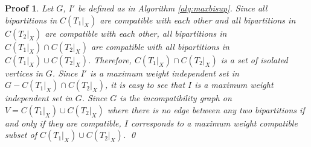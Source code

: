 \documentclass{bmcart}
\theoremstyle{mystyle}
\theoremstyle{proofstyle}
\newtheorem*{proof2}{Proof}
\newenvironment{proofnospace}{\begin{proof2}}{\qed \end{proof2}}
\begin{document}
\claimMaxCompatibleSubset*
\begin{proofnospace}
    Let $G$, $I'$ be defined as in Algorithm \ref{alg:maxbisup}. Since all bipartitions in $C(T_1|_X)$ are compatible with each other and all bipartitions in $C(T_2|_X)$ are compatible with each other, all bipartitions in $C(T_1|_X) \cap C(T_2|_X)$ are compatible with all bipartitions in $C(T_1|_X) \cup C(T_2|_X)$. Therefore, $C(T_1|_X) \cap C(T_2|_X)$ is a set of isolated vertices in $G$. Since $I'$ is a maximum weight independent set in $G - C(T_1|_X) \cap C(T_2|_X)$, it is easy to see that $I$ is a maximum weight independent set in $G$. Since $G$ is the incompatibility graph on $V = C(T_1|_X) \cup C(T_2|_X)$ where there is no edge between any two bipartitions if and only if they are compatible, $I$ corresponds to a maximum weight compatible subset of $C(T_1|_X) \cup C(T_2|_X)$.
\end{proofnospace}
\end{document}
